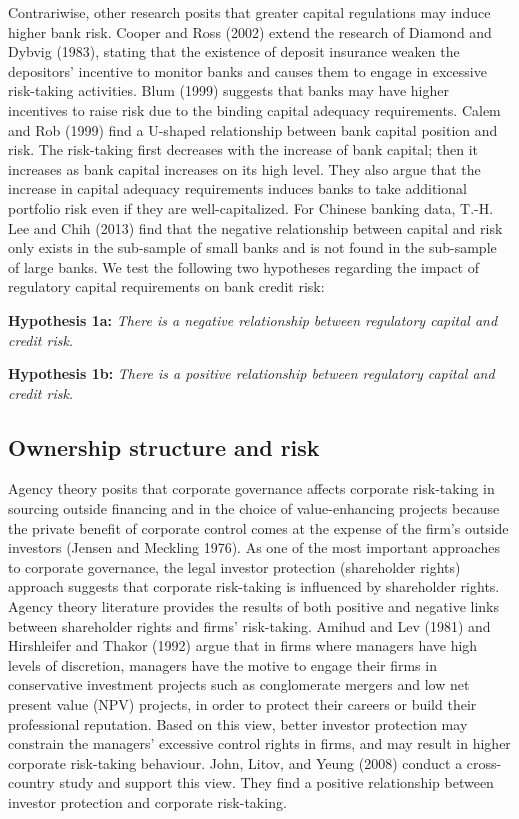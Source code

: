 \documentclass{article}
\begin{document}
Contrariwise, other research posits that greater capital regulations may
induce higher bank risk. Cooper and Ross (2002) extend the research of
Diamond and Dybvig (1983), stating that the existence of deposit
insurance weaken the depositors' incentive to monitor banks and causes
them to engage in excessive risk-taking activities. Blum (1999) suggests
that banks may have higher incentives to raise risk due to the binding
capital adequacy requirements. Calem and Rob (1999) find a U-shaped
relationship between bank capital position and risk. The risk-taking
first decreases with the increase of bank capital; then it increases as
bank capital increases on its high level. They also argue that the
increase in capital adequacy requirements induces banks to take
additional portfolio risk even if they are well-capitalized. For Chinese
banking data, T.-H. Lee and Chih (2013) find that the negative
relationship between capital and risk only exists in the sub-sample of
small banks and is not found in the sub-sample of large banks. We test
the following two hypotheses regarding the impact of regulatory capital
requirements on bank credit risk:

\textbf{Hypothesis 1a:} \emph{There is a negative relationship between
regulatory capital and credit risk.}

\textbf{Hypothesis 1b:} \emph{There is a positive relationship between
regulatory capital and credit risk.}

\hypertarget{ownership-structure-and-risk}{%
\subsection{Ownership structure and
risk}\label{ownership-structure-and-risk}}

Agency theory posits that corporate governance affects corporate
risk-taking in sourcing outside financing and in the choice of
value-enhancing projects because the private benefit of corporate
control comes at the expense of the firm's outside investors (Jensen and
Meckling 1976). As one of the most important approaches to corporate
governance, the legal investor protection (shareholder rights) approach
suggests that corporate risk-taking is influenced by shareholder rights.
Agency theory literature provides the results of both positive and
negative links between shareholder rights and firms' risk-taking. Amihud
and Lev (1981) and Hirshleifer and Thakor (1992) argue that in firms
where managers have high levels of discretion, managers have the motive
to engage their firms in conservative investment projects such as
conglomerate mergers and low net present value (NPV) projects, in order
to protect their careers or build their professional reputation. Based
on this view, better investor protection may constrain the managers'
excessive control rights in firms, and may result in higher corporate
risk-taking behaviour. John, Litov, and Yeung (2008) conduct a
cross-country study and support this view. They find a positive
relationship between investor protection and corporate risk-taking.
\end{document}
